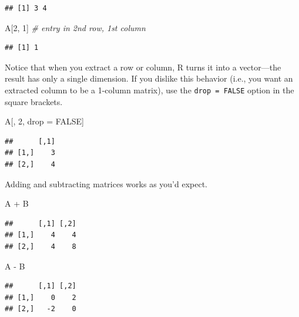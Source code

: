 \documentclass[12pt,oneside,openany]{book}
\newenvironment{Shaded}{\begin{snugshade}}{\end{snugshade}}
\newcommand{\DecValTok}[1]{\textcolor[rgb]{0.00,0.00,0.81}{{#1}}}
\newcommand{\StringTok}[1]{\textcolor[rgb]{0.31,0.60,0.02}{{#1}}}
\newcommand{\CommentTok}[1]{\textcolor[rgb]{0.56,0.35,0.01}{\textit{{#1}}}}
\newcommand{\OtherTok}[1]{\textcolor[rgb]{0.56,0.35,0.01}{{#1}}}
\newcommand{\NormalTok}[1]{{#1}}
\begin{document}
\begin{verbatim}
## [1] 3 4
\end{verbatim}

\begin{Shaded}
\begin{Highlighting}[]
\NormalTok{A[}\DecValTok{2}\NormalTok{, }\DecValTok{1}\NormalTok{]  }\CommentTok{# entry in 2nd row, 1st column}
\end{Highlighting}
\end{Shaded}

\begin{verbatim}
## [1] 1
\end{verbatim}

Notice that when you extract a row or column, R turns it into a
vector---the result has only a single dimension. If you dislike this
behavior (i.e., you want an extracted column to be a 1-column matrix),
use the \texttt{drop\ =\ FALSE} option in the square brackets.

\begin{Shaded}
\begin{Highlighting}[]
\NormalTok{A[, }\DecValTok{2}\NormalTok{, drop =}\StringTok{ }\OtherTok{FALSE}\NormalTok{]}
\end{Highlighting}
\end{Shaded}

\begin{verbatim}
##      [,1]
## [1,]    3
## [2,]    4
\end{verbatim}

Adding and subtracting matrices works as you'd expect.

\begin{Shaded}
\begin{Highlighting}[]
\NormalTok{A +}\StringTok{ }\NormalTok{B}
\end{Highlighting}
\end{Shaded}

\begin{verbatim}
##      [,1] [,2]
## [1,]    4    4
## [2,]    4    8
\end{verbatim}

\begin{Shaded}
\begin{Highlighting}[]
\NormalTok{A -}\StringTok{ }\NormalTok{B}
\end{Highlighting}
\end{Shaded}

\begin{verbatim}
##      [,1] [,2]
## [1,]    0    2
## [2,]   -2    0
\end{verbatim}
\end{document}
